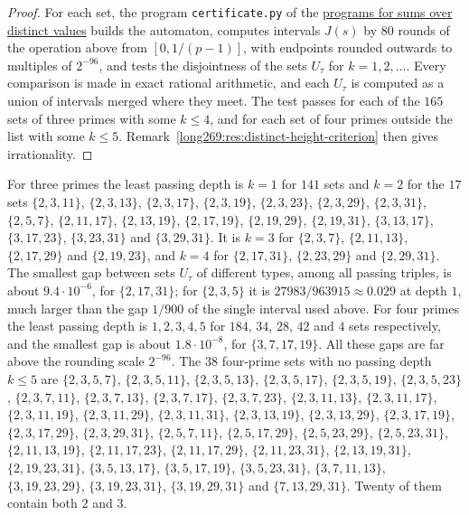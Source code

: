 \begin{proof}
For each set, the program \texttt{certificate.py} of the
\href{\distinctheighturl}{programs for sums over distinct values} builds the automaton,
computes intervals $J(s)$ by $80$ rounds of the operation above from
$[0,1/(p-1)]$, with endpoints rounded outwards to multiples of $2^{-96}$, and
tests the disjointness of the sets $U_\tau$ for $k=1,2,\ldots$.  Every
comparison is made in exact rational arithmetic, and each $U_\tau$ is
computed as a union of intervals merged where they meet.  The test passes for
each of the $165$ sets of three primes with some $k\le4$, and for each set of
four primes outside the list with some $k\le5$.
Remark~\ref{long269:res:distinct-height-criterion} then gives
irrationality.
\end{proof}

For three primes the least passing depth is $k=1$ for $141$ sets and $k=2$
for the $17$ sets
$\{2,3,11\}$, $\{2,3,13\}$, $\{2,3,17\}$, $\{2,3,19\}$, $\{2,3,23\}$,
$\{2,3,29\}$, $\{2,3,31\}$, $\{2,5,7\}$, $\{2,11,17\}$, $\{2,13,19\}$,
$\{2,17,19\}$, $\{2,19,29\}$, $\{2,19,31\}$, $\{3,13,17\}$, $\{3,17,23\}$,
$\{3,23,31\}$ and $\{3,29,31\}$.  It is $k=3$ for $\{2,3,7\}$,
$\{2,11,13\}$, $\{2,17,29\}$ and $\{2,19,23\}$, and $k=4$ for
$\{2,17,31\}$, $\{2,23,29\}$ and $\{2,29,31\}$.  The smallest gap between
sets $U_\tau$ of different types, among all passing triples, is about
$9.4\cdot10^{-6}$, for $\{2,17,31\}$; for $\{2,3,5\}$ it is
$27983/963915\approx0.029$ at depth $1$, much larger than the gap $1/900$ of
the single interval used above.  For four primes the least passing depth is
$1,2,3,4,5$ for $184$, $34$, $28$, $42$ and $4$ sets respectively, and the
smallest gap is about $1.8\cdot10^{-8}$, for $\{3,7,17,19\}$.  All these gaps
are far above the rounding scale $2^{-96}$.  The $38$ four-prime sets with no
passing depth $k\le5$ are $\{2,3,5,7\}$, $\{2,3,5,11\}$, $\{2,3,5,13\}$,
$\{2,3,5,17\}$, $\{2,3,5,19\}$, $\{2,3,5,23\}$, $\{2,3,7,11\}$,
$\{2,3,7,13\}$, $\{2,3,7,17\}$, $\{2,3,7,23\}$, $\{2,3,11,13\}$,
$\{2,3,11,17\}$, $\{2,3,11,19\}$, $\{2,3,11,29\}$, $\{2,3,11,31\}$,
$\{2,3,13,19\}$, $\{2,3,13,29\}$, $\{2,3,17,19\}$, $\{2,3,17,29\}$,
$\{2,3,29,31\}$, $\{2,5,7,11\}$, $\{2,5,17,29\}$, $\{2,5,23,29\}$,
$\{2,5,23,31\}$, $\{2,11,13,19\}$, $\{2,11,17,23\}$, $\{2,11,17,29\}$,
$\{2,11,23,31\}$, $\{2,13,19,31\}$, $\{2,19,23,31\}$, $\{3,5,13,17\}$,
$\{3,5,17,19\}$, $\{3,5,23,31\}$, $\{3,7,11,13\}$, $\{3,19,23,29\}$,
$\{3,19,23,31\}$, $\{3,19,29,31\}$ and $\{7,13,29,31\}$.  Twenty of them
contain both $2$ and $3$.

